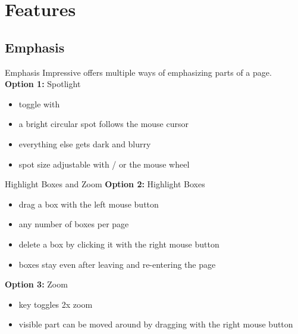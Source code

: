\documentclass[bigger,hyperref={colorlinks=true,linkcolor=white,urlcolor=blue}]{beamer}
\begin{document}
\section{Features}

\subsection{Emphasis}
\begin{frame}{Emphasis}
    Impressive offers multiple ways of emphasizing parts of a page.
    \vspace{0.5cm} \\
    \textbf{Option 1:} {\glqq}Spotlight{\grqq}
    \begin{itemize}
        \item toggle with \Enter
        \item a bright circular spot follows the mouse cursor
        \item everything else gets dark and blurry
        \item spot size adjustable with \keystroke{+}/\keystroke{--} or the mouse wheel
    \end{itemize}
\end{frame}
\begin{frame}{Highlight Boxes and Zoom}
    \textbf{Option 2:} Highlight Boxes
    \begin{itemize}
        \item drag a box with the left mouse button
        \item any number of boxes per page
        \item delete a box by clicking it with the right mouse button
        \item boxes stay even after leaving and re-entering the page
    \end{itemize}
    
    \textbf{Option 3:} Zoom
    \begin{itemize}
        \item {} key toggles 2x zoom
        \item visible part can be moved around
              by dragging with the right mouse button
    \end{itemize}
\end{frame}
\end{document}
